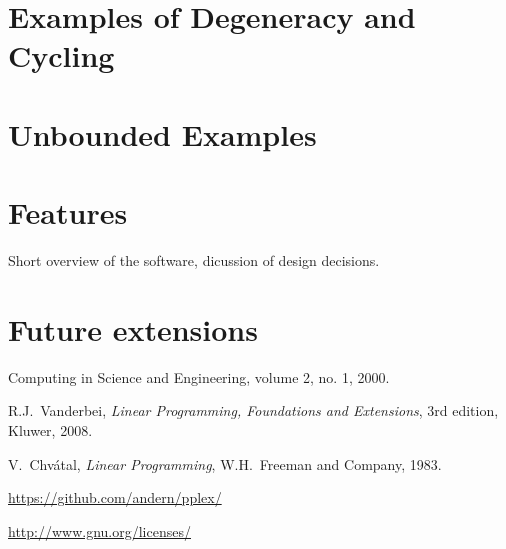 \documentclass[ukenglish]{nik}
\begin{document}
\section{Examples of Degeneracy and Cycling}
\begin{alltt}

\end{alltt}

\section{Unbounded Examples}


\section{Features}
Short overview of the software, dicussion of design decisions.

\section{Future extensions}





\begin{thebibliography}{99}
 Computing in Science and Engineering, volume 2, no. 1, 2000.

 R.J.~Vanderbei, 
\emph{Linear Programming, Foundations and Extensions},
3rd edition, Kluwer, 2008.

 V.~Chv\'atal,
\emph{Linear Programming},
W.H.~Freeman and Company, 1983.

\url{https://github.com/andern/pplex/}

\url{http://www.gnu.org/licenses/}

\end{thebibliography}
\end{document}
